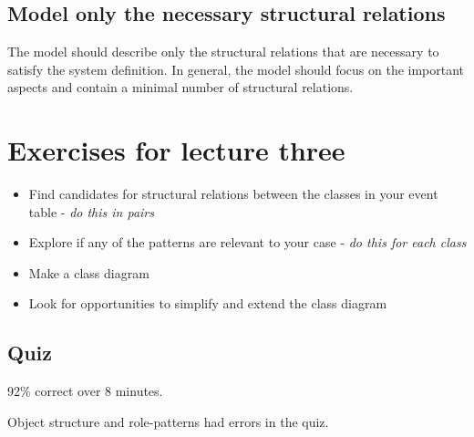 \subsection{Model only the necessary structural relations}
The model should describe only the structural relations that are necessary to satisfy the system definition. In general, the model should focus on the important aspects and contain a minimal number of structural relations. 

\section{Exercises for lecture three}
\begin{itemize}
    \item Find candidates for structural relations between the classes in your event table - \textit{do this in pairs}
    \item Explore if any of the patterns are relevant to your case - \textit{do this for each class}
    \item Make a class diagram
    \item Look for opportunities to simplify and extend the class diagram
\end{itemize}
\subsection{Quiz}
92\% correct over 8 minutes.

Object structure and role-patterns had errors in the quiz.